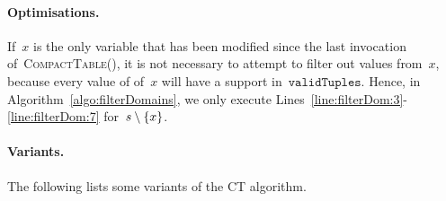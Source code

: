 \documentclass[a4paper,11pt]{article}
\newcommand{\Todo}[1]{{\color{blue}#1}}
\newcommand{\Algoref}[1]{Algorithm~\ref{#1}}
\newcommand{\Linesref}[2]{Lines~\ref{#1}-\ref{#2}}
\newcommand{\CurrTable}{\texttt{validTuples}}
\def\CompactTable{\textsc{CompactTable}}
\numberwithin{equation}{section}
\begin{document}
  



%     

\paragraph{Optimisations.} If~$x$ is the only variable
that has been modified since the last invocation of~\CompactTable(),
it is not necessary to attempt to filter out values from~$x$, because
every value of of~$x$ will have a support in~$\CurrTable$.
Hence, in \Algoref{algo:filterDomains}, we only execute
\Linesref{line:filterDom:3}{line:filterDom:7} for~$s \setminus \left\{x\right\}$.

\paragraph{Variants.}
The following lists some variants of the CT algorithm.
\newline 
\end{document}
